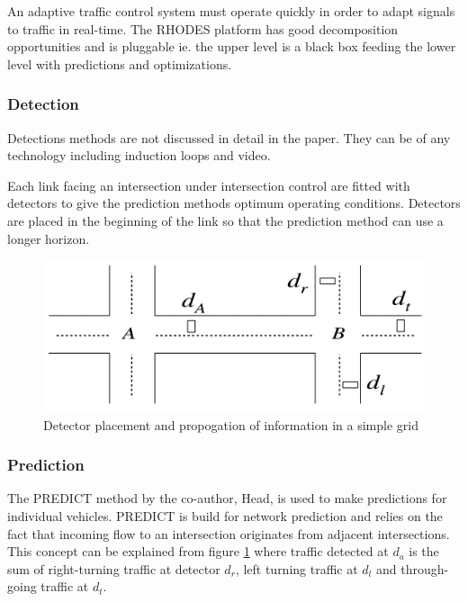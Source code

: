 An adaptive traffic control system must operate quickly in order to adapt signals to traffic in real-time. The RHODES platform has good decomposition opportunities and is pluggable ie. the upper level is a black box feeding the lower level with predictions and optimizations.

\subsubsection*{Detection}
Detections methods are not discussed in detail in the paper. They can be of any technology including induction loops and video. 

Each link facing an intersection under intersection control are fitted with detectors to give the prediction methods optimum operating conditions. Detectors are placed in the beginning of the link so that the prediction method can use a longer horizon.

\begin{figure}[!ht]
\begin{center}
\includegraphics[scale=0.5]{rhodes_prediction-strategy.png} 
\end{center}
\caption{Detector placement and propogation of information in a simple grid}
\label{fig:rhodes_predict}
\end{figure}

\subsubsection*{Prediction}
The PREDICT method by the co-author, Head, is used to make predictions for individual vehicles. PREDICT is build for network prediction and relies on the fact that incoming flow to an intersection originates from adjacent intersections. This concept can be explained from figure \ref{fig:rhodes_predict} where traffic detected at $d_a$ is the sum of right-turning traffic at detector $d_r$, left turning traffic at $d_l$ and through-going traffic at $d_t$.

